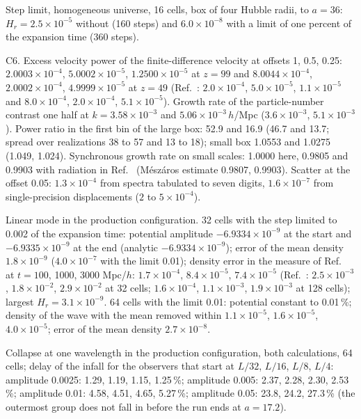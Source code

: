 \documentclass[aps,prd,twocolumn,10pt,superscriptaddress,nofootinbib,longbibliography,floatfix]{revtex4-2}
\begin{document}
Step limit, homogeneous universe, 16 cells, box of four Hubble radii, to $a = 36$: $H_r = 2.5\times10^{-5}$ without (160 steps) and $6.0\times10^{-8}$ with a limit of one percent of the expansion time (360 steps).

C6. Excess velocity power of the finite-difference velocity at offsets 1, 0.5, 0.25: $2.0003\times10^{-4}$, $5.0002\times10^{-5}$, $1.2500\times10^{-5}$ at $z = 99$ and $8.0044\times10^{-4}$, $2.0002\times10^{-4}$, $4.9999\times10^{-5}$ at $z = 49$ (Ref.~\cite{Barrera-Hinojosa:2020arz}: $2.0\times10^{-4}$, $5.0\times10^{-5}$, $1.1\times10^{-5}$ and $8.0\times10^{-4}$, $2.0\times10^{-4}$, $5.1\times10^{-5}$). Growth rate of the particle-number contrast one half at $k = 3.58\times10^{-3}$ and $5.06\times10^{-3}\,h$/Mpc ($3.6\times10^{-3}$, $5.1\times10^{-3}$). Power ratio in the first bin of the large box: 52.9 and 16.9 (46.7 and 13.7; spread over realizations 38 to 57 and 13 to 18); small box 1.0553 and 1.0275 (1.049, 1.024). Synchronous growth rate on small scales: 1.0000 here, 0.9805 and 0.9903 with radiation in Ref.~\cite{Barrera-Hinojosa:2020arz} (M\'esz\'aros estimate 0.9807, 0.9903). Scatter at the offset 0.05: $1.3\times10^{-4}$ from spectra tabulated to seven digits, $1.6\times10^{-7}$ from single-precision displacements ($2$ to $5\times10^{-4}$).

Linear mode in the production configuration. 32 cells with the step limited to 0.002 of the expansion time: potential amplitude $-6.9334\times10^{-9}$ at the start and $-6.9335\times10^{-9}$ at the end (analytic $-6.9334\times10^{-9}$); error of the mean density $1.8\times10^{-9}$ ($4.0\times10^{-7}$ with the limit 0.01); density error in the measure of Ref.~\cite{Daverio:2019gql} at $t = 100$, 1000, 3000 Mpc/$h$: $1.7\times10^{-4}$, $8.4\times10^{-5}$, $7.4\times10^{-5}$ (Ref.~\cite{Daverio:2019gql}: $2.5\times10^{-3}$, $1.8\times10^{-2}$, $2.9\times10^{-2}$ at 32 cells; $1.6\times10^{-4}$, $1.1\times10^{-3}$, $1.9\times10^{-3}$ at 128 cells); largest $H_r = 3.1\times10^{-9}$. 64 cells with the limit 0.01: potential constant to 0.01\,\%; density of the wave with the mean removed within $1.1\times10^{-5}$, $1.6\times10^{-5}$, $4.0\times10^{-5}$; error of the mean density $2.7\times10^{-8}$.

Collapse at one wavelength in the production configuration, both calculations, 64 cells; delay of the infall for the observers that start at $L/32$, $L/16$, $L/8$, $L/4$: amplitude 0.0025: 1.29, 1.19, 1.15, 1.25\,\%; amplitude 0.005: 2.37, 2.28, 2.30, 2.53\,\%; amplitude 0.01: 4.58, 4.51, 4.65, 5.27\,\%; amplitude 0.05: 23.8, 24.2, 27.3\,\% (the outermost group does not fall in before the run ends at $a = 17.2$).
\end{document}
